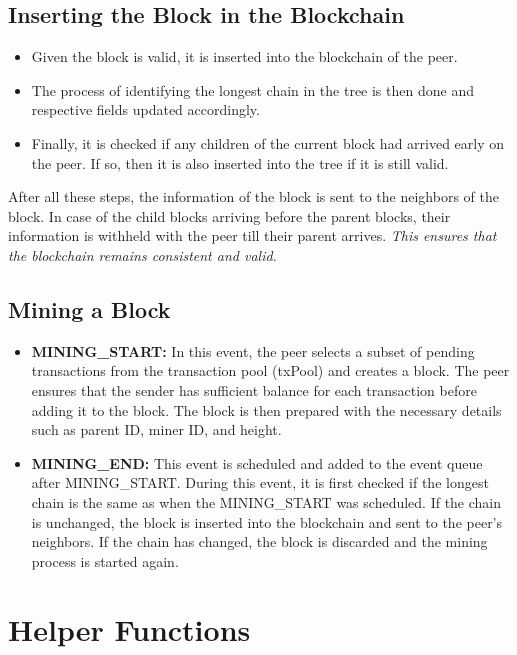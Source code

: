 \documentclass[a4paper,12pt]{article}
\begin{document}
\subsection*{Inserting the Block in the Blockchain}

\begin{itemize}
    \item Given the block is valid, it is inserted into the blockchain of the peer.
    \item The process of identifying the longest chain in the tree is then done and respective fields updated accordingly.
    \item Finally, it is checked if any children of the current block had arrived early on the peer. If so, then it is also inserted into the tree if it is still valid.
\end{itemize}

After all these steps, the information of the block is sent to the neighbors of the block. In case of the child blocks arriving before the parent blocks, 
their information is withheld with the peer till their parent arrives. 
\textit{This ensures that the blockchain remains consistent and valid.}

\subsection*{Mining a Block}

\begin{itemize}
    \item \textbf{MINING\_START:} In this event, the peer selects a subset of pending transactions from the transaction pool (txPool) and creates a block. The peer ensures that the sender has sufficient balance for each transaction before adding it to the block. The block is then prepared with the necessary details such as parent ID, miner ID, and height.
    \item \textbf{MINING\_END:} This event is scheduled and added to the event queue after MINING\_START. During this event, it is first checked if the longest chain is the same as when the MINING\_START was scheduled. If the chain is unchanged, the block is inserted into the blockchain and sent to the peer's neighbors. If the chain has changed, the block is discarded and the mining process is started again.
\end{itemize}

\section*{Helper Functions}
\end{document}
